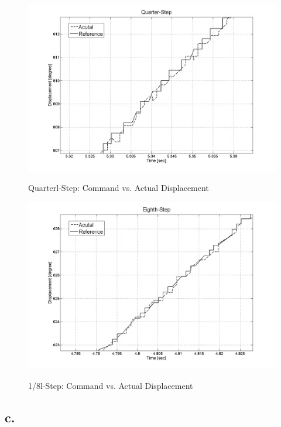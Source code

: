 \documentclass{article}
\theoremstyle{plain}
\theoremstyle{definition}
\theoremstyle{remark}
\begin{document}
\begin{figure}[htb]
\begin{center}
\includegraphics[width=14cm]{Q4_quarter_step_L.png}
\caption{Quarterl-Step: Command vs. Actual Displacement} \label{tex}
\label{fig:q4_17}
\end{center}
\end{figure}

\begin{figure}[htb]
\begin{center}
\includegraphics[width=14cm]{Q4_eighth_step_L.png}
\caption{1/8l-Step: Command vs. Actual Displacement} \label{tex}
\label{fig:q4_18}
\end{center}
\end{figure}

\clearpage 


\subsection*{c.}
\end{document}
